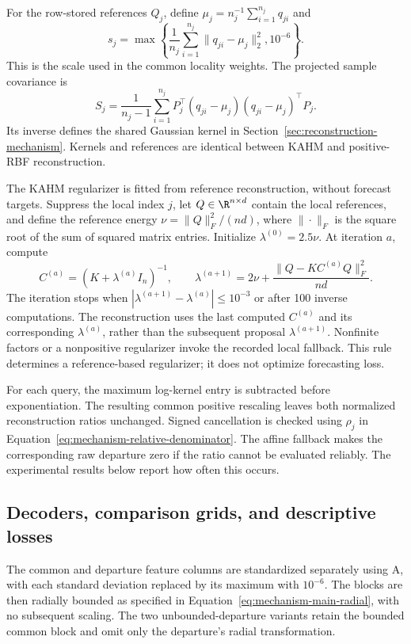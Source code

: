 For the row-stored references $Q_j$, define
$\mu_j=n_j^{-1}\sum_{i=1}^{n_j}q_{ji}$ and
\[
 s_j=\max\left\{\frac1{n_j}\sum_{i=1}^{n_j}
                \|q_{ji}-\mu_j\|_2^2,10^{-6}\right\}.
\]
This is the scale used in the common locality weights. The projected
sample covariance is
\[
 S_j=\frac1{n_j-1}\sum_{i=1}^{n_j}
       P_j^\top(q_{ji}-\mu_j)(q_{ji}-\mu_j)^\top P_j.
\]
Its inverse defines the shared Gaussian kernel in
Section~\ref{sec:reconstruction-mechanism}. Kernels and references are
identical between KAHM and positive-RBF reconstruction.

The KAHM regularizer is fitted from reference reconstruction, without
forecast targets. Suppress the local index $j$, let $Q\in\R^{n\times d}$
contain the local references, and define the reference energy
$\nu=\|Q\|_F^2/(nd)$, where $\|\cdot\|_F$ is the square root of the
sum of squared matrix entries. Initialize $\lambda^{(0)}=2.5\nu$.
At iteration $a$, compute
\[
 C^{(a)}=(K+\lambda^{(a)}I_n)^{-1},\qquad
 \lambda^{(a+1)}=2\nu+
     \frac{\|Q-KC^{(a)}Q\|_F^2}{nd}.
\]
The iteration stops when
$|\lambda^{(a+1)}-\lambda^{(a)}|\le10^{-3}$ or after 100 inverse
computations. The reconstruction uses the last computed $C^{(a)}$ and
its corresponding $\lambda^{(a)}$, rather than the subsequent proposal
$\lambda^{(a+1)}$. Nonfinite factors or a nonpositive regularizer invoke
the recorded local fallback. This rule determines a reference-based
regularizer; it does not optimize forecasting loss.

For each query, the maximum log-kernel entry is subtracted before
exponentiation. The resulting common positive rescaling leaves both
normalized reconstruction ratios unchanged. Signed cancellation is
checked using $\rho_j$ in Equation~\eqref{eq:mechanism-relative-denominator}.
The affine fallback makes the corresponding raw departure zero if the ratio
cannot be evaluated reliably. The experimental results below report how
often this occurs.

\subsection{Decoders, comparison grids, and descriptive losses}

The common and departure feature columns are standardized separately
using A, with each standard deviation replaced by its maximum with
$10^{-6}$. The blocks are then radially bounded as specified in
Equation~\eqref{eq:mechanism-main-radial}, with no subsequent scaling.
The two unbounded-departure variants retain the bounded common block
and omit only the departure's radial transformation.

